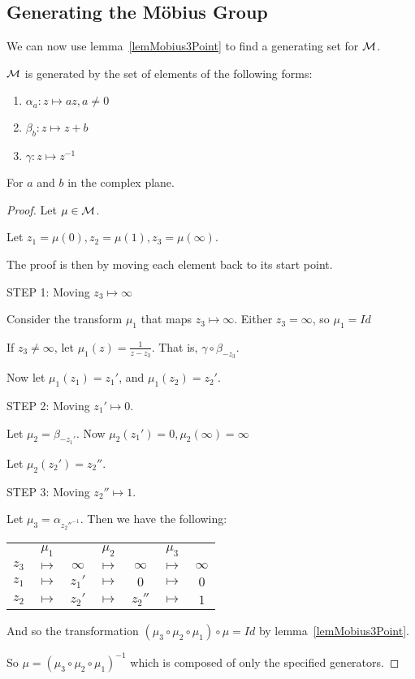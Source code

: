 \documentclass[../Main.tex]{subfiles}
\begin{document}
\subsection{Generating the M\"obius Group}
We can now use lemma~\ref{lemMobius3Point} to find a generating set for $\mathcal{M}$.
\begin{proposition}
    $\mathcal{M}$ is generated by the set of elements of the following forms:
    \begin{enumerate}
        \item $\alpha_a: z \mapsto az, a \neq 0$
        \item $\beta_b: z \mapsto z + b$
        \item $\gamma: z \mapsto z^{-1}$
    \end{enumerate}
    For $a$ and $b$ in the complex plane.
    \label{propMobiusGeneratingSet}
\end{proposition}
\begin{proof}
    Let $\mu \in \mathcal{M}$.\par
    Let $z_1 = \mu(0), z_2 = \mu(1), z_3 = \mu(\infty)$.\par
    The proof is then by moving each element back to its start point.\par
    STEP 1: Moving $z_3 \mapsto \infty$\par
    Consider the transform $\mu_1$ that maps $z_3 \mapsto \infty$. Either $z_3 = \infty$, so $\mu_1 = Id$\par
    If $z_3 \neq \infty$, let $\mu_1(z) = \frac{1}{z - z_3}$. That is, $\gamma \circ \beta_{-z_3}$.\par
    Now let $\mu_1(z_1) = z_1'$, and $\mu_1(z_2) = z_2'$.\par
    STEP 2: Moving $z_1' \mapsto 0$.\par
    Let $\mu_2 = \beta_{-z_1'}$. Now $\mu_2(z_1') = 0, \mu_2(\infty) = \infty$\par
    Let $\mu_2(z_2') = z_2''$.\par
    STEP 3: Moving $z_2'' \mapsto 1$.\par
    Let $\mu_3 = \alpha_{z_2''^{-1}}$. Then we have the following:\par
    \begin{tabular}{c c c c c c c}
         & $\mu_1$ & & $\mu_2$ & & $\mu_3$ & \\
        $z_3$ & $\mapsto$ & $\infty$ & $\mapsto$ & $\infty$ & $\mapsto$ & $\infty$ \\
        $z_1$ & $\mapsto$ & $z_1'$ & $\mapsto$ & $0$ & $\mapsto$ & $0$ \\
        $z_2$ & $\mapsto$ & $z_2'$ & $\mapsto$ & $z_2''$ & $\mapsto$ & $1$ \\
    \end{tabular}
    And so the transformation $(\mu_3 \circ \mu_2 \circ \mu_1) \circ \mu = Id$ by lemma~\ref{lemMobius3Point}.\par
    So $\mu = (\mu_3 \circ \mu_2 \circ \mu_1)^{-1}$ which is composed of only the specified generators.
\end{proof}
\end{document}
